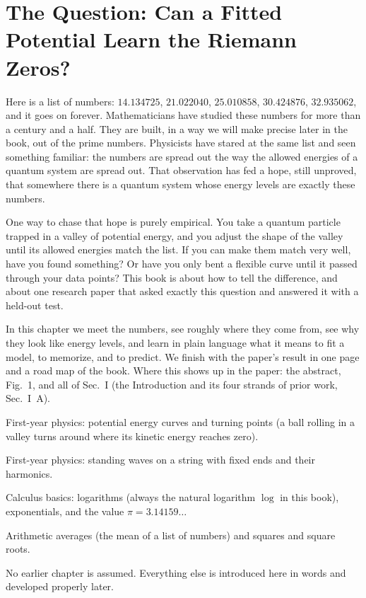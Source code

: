 \chapter{The Question: Can a Fitted Potential Learn the Riemann Zeros?}\label{ch:intro}

\begin{chapterintro}
Here is a list of numbers: $14.134725$, $21.022040$, $25.010858$, $30.424876$, $32.935062$, and it goes on forever. Mathematicians have studied these numbers for more than a century and a half. They are built, in a way we will make precise later in the book, out of the prime numbers. Physicists have stared at the same list and seen something familiar: the numbers are spread out the way the allowed energies of a quantum system are spread out. That observation has fed a hope, still unproved, that somewhere there is a quantum system whose energy levels are exactly these numbers.

One way to chase that hope is purely empirical. You take a quantum particle trapped in a valley of potential energy, and you adjust the shape of the valley until its allowed energies match the list. If you can make them match very well, have you found something? Or have you only bent a flexible curve until it passed through your data points? This book is about how to tell the difference, and about one research paper \cite{soniR1} that asked exactly this question and answered it with a held-out test.

In this chapter we meet the numbers, see roughly where they come from, see why they look like energy levels, and learn in plain language what it means to fit a model, to memorize, and to predict. We finish with the paper's result in one page and a road map of the book. Where this shows up in the paper: the abstract, Fig.~1, and all of Sec.~I (the Introduction and its four strands of prior work, Sec.~I~A).
\end{chapterintro}

\begin{prerequisites}
\item First-year physics: potential energy curves and turning points (a ball rolling in a valley turns around where its kinetic energy reaches zero).
\item First-year physics: standing waves on a string with fixed ends and their harmonics.
\item Calculus basics: logarithms (always the natural logarithm $\log$ in this book), exponentials, and the value $\pi = 3.14159\ldots$
\item Arithmetic averages (the mean of a list of numbers) and squares and square roots.
\item No earlier chapter is assumed. Everything else is introduced here in words and developed properly later.
\end{prerequisites}

